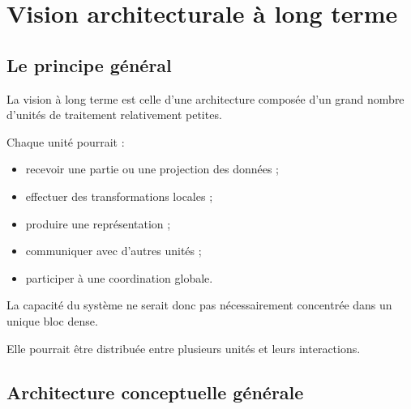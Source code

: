 \documentclass[11pt,a4paper]{report}
\begin{document}
\chapter{Vision architecturale à long terme}

\section{Le principe général}

La vision à long terme est celle d'une architecture
composée d'un grand nombre d'unités de traitement
relativement petites.

Chaque unité pourrait :

\begin{itemize}
  \item recevoir une partie ou une projection des données ;
  \item effectuer des transformations locales ;
  \item produire une représentation ;
  \item communiquer avec d'autres unités ;
  \item participer à une coordination globale.
\end{itemize}

La capacité du système ne serait donc pas nécessairement
concentrée dans un unique bloc dense.

Elle pourrait être distribuée entre plusieurs unités
et leurs interactions.

\section{Architecture conceptuelle générale}
\end{document}

